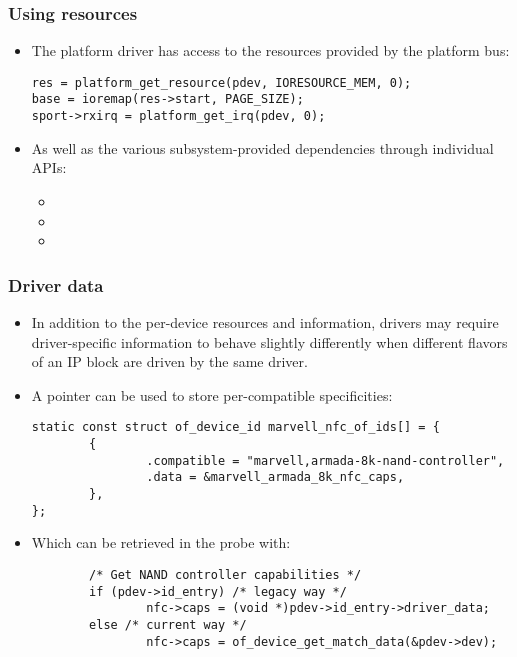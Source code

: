 \begin{frame}[fragile]
  \frametitle{Using resources}
  \begin{itemize}
  \item The platform driver has access to the resources provided by
    the platform bus:
    \begin{block}{}
  \begin{verbatim}
res = platform_get_resource(pdev, IORESOURCE_MEM, 0);
base = ioremap(res->start, PAGE_SIZE);
sport->rxirq = platform_get_irq(pdev, 0);
  \end{verbatim}
  \end{block}
  \item As well as the various subsystem-provided dependencies through
    individual APIs:
    \begin{itemize}
    \item {}
    \item {}
    \item {}
    \end{itemize}
  \end{itemize}
\end{frame}

\begin{frame}[fragile]
  \frametitle{Driver data}
  \begin{itemize}
  \item In addition to the per-device resources and information, drivers
    may require driver-specific information to behave slightly
    differently when different flavors of an IP block are driven by the
    same driver.
  \item A  pointer can be used to store
    per-compatible specificities:
    \begin{block}{}
      \begin{verbatim}
static const struct of_device_id marvell_nfc_of_ids[] = {
        {
                .compatible = "marvell,armada-8k-nand-controller",
                .data = &marvell_armada_8k_nfc_caps,
        },
};
  \end{verbatim}
  \end{block}
  \item Which can be retrieved in the probe with:
    \begin{block}{}
  \begin{verbatim}
        /* Get NAND controller capabilities */
        if (pdev->id_entry) /* legacy way */
                nfc->caps = (void *)pdev->id_entry->driver_data;
        else /* current way */
                nfc->caps = of_device_get_match_data(&pdev->dev);
  \end{verbatim}
  \end{block}
  \end{itemize}
\end{frame}
